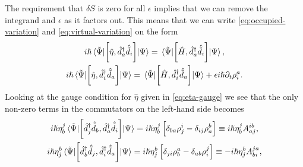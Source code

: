            The requirement that $\delta S$ is zero for all $\epsilon$ implies
            that we can remove the integrand and $\epsilon$ as it factors out.
            This means that we can write \autoref{eq:occupied-variation} and
            \autoref{eq:virtual-variation} on the form
            \begin{gather}
                i\hslash\mel*{\tilde{\Psi}}{
                    \left[
                        \hat{\eta}
                    , 
                        \hat{d}^{\dagger}_{a}\hat{\tilde{d}}_{i}
                    \right]
                }{\Psi}
                =
                \mel*{\tilde{\Psi}}{
                    \left[
                        \hat{H}
                    , 
                        \hat{d}^{\dagger}_{a}\hat{\tilde{d}}_{i}
                    \right]
                }{\Psi},
                \\
                i\hslash\mel*{\tilde{\Psi}}{
                    \left[
                        \hat{\eta}
                    , 
                        \hat{d}^{\dagger}_{i}\hat{\tilde{d}}_{a}
                    \right]
                }{\Psi}
                =
                \mel*{\tilde{\Psi}}{
                    \left[
                        \hat{H}
                    , 
                        \hat{d}^{\dagger}_{i}\hat{\tilde{d}}_{a}
                    \right]
                }{\Psi}
                + \epsilon i\hslash\partial_t\rho^{a}_{i}.
            \end{gather}
            Looking at the gauge condition for $\hat{\eta}$ given in
            \autoref{eq:eta-gauge} we see that the only non-zero terms in the
            commutators on the left-hand side becomes
            \begin{gather}
                i\hslash\eta^{j}_{b}\mel*{\tilde{\Psi}}{
                    \left[
                        \hat{d}^{\dagger}_{j}\hat{\tilde{d}}_{b}
                    , 
                        \hat{d}^{\dagger}_{a}\hat{\tilde{d}}_{i}
                    \right]
                }{\Psi}
                = i\hslash\eta^{j}_{b}\left[ 
                    \delta_{ba}\rho^{i}_{j}
                    - \delta_{ij}\rho^{b}_{a}
                 \right]
                \equiv
                i\hslash\eta^{j}_{b}A^{ib}_{aj},
                \\
                i\hslash\eta^{b}_{j}\mel*{\tilde{\Psi}}{
                    \left[
                        \hat{d}^{\dagger}_{b}\hat{\tilde{d}}_{j}
                    , 
                        \hat{d}^{\dagger}_{i}\hat{\tilde{d}}_{a}
                    \right]
                }{\Psi}
                =
                i\hslash\eta^{b}_{j}\left[ 
                    \delta_{ji}\rho^{a}_{b}
                    - \delta_{ab}\rho^{j}_{i}
                 \right]
                \equiv
                -i\hslash\eta^{b}_{j}
                A^{ja}_{bi},
            \end{gather}

